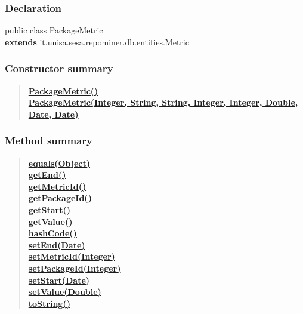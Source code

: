 {{{\subsubsection{Declaration}{
\small public class PackageMetric
\\ {\bf  extends} it.unisa.sesa.repominer.db.entities.Metric
}
\subsubsection{Constructor summary}{
\begin{verse}
\hyperlink{it.unisa.sesa.repominer.db.entities.PackageMetric()}{{\bf PackageMetric()}} \\
\hyperlink{it.unisa.sesa.repominer.db.entities.PackageMetric(java.lang.Integer, java.lang.String, java.lang.String, java.lang.Integer, java.lang.Integer, java.lang.Double, java.util.Date, java.util.Date)}{{\bf PackageMetric(Integer, String, String, Integer, Integer, Double, Date, Date)}} \\
\end{verse}
}
\subsubsection{Method summary}{
\begin{verse}
\hyperlink{it.unisa.sesa.repominer.db.entities.PackageMetric.equals(java.lang.Object)}{{\bf equals(Object)}} \\
\hyperlink{it.unisa.sesa.repominer.db.entities.PackageMetric.getEnd()}{{\bf getEnd()}} \\
\hyperlink{it.unisa.sesa.repominer.db.entities.PackageMetric.getMetricId()}{{\bf getMetricId()}} \\
\hyperlink{it.unisa.sesa.repominer.db.entities.PackageMetric.getPackageId()}{{\bf getPackageId()}} \\
\hyperlink{it.unisa.sesa.repominer.db.entities.PackageMetric.getStart()}{{\bf getStart()}} \\
\hyperlink{it.unisa.sesa.repominer.db.entities.PackageMetric.getValue()}{{\bf getValue()}} \\
\hyperlink{it.unisa.sesa.repominer.db.entities.PackageMetric.hashCode()}{{\bf hashCode()}} \\
\hyperlink{it.unisa.sesa.repominer.db.entities.PackageMetric.setEnd(java.util.Date)}{{\bf setEnd(Date)}} \\
\hyperlink{it.unisa.sesa.repominer.db.entities.PackageMetric.setMetricId(java.lang.Integer)}{{\bf setMetricId(Integer)}} \\
\hyperlink{it.unisa.sesa.repominer.db.entities.PackageMetric.setPackageId(java.lang.Integer)}{{\bf setPackageId(Integer)}} \\
\hyperlink{it.unisa.sesa.repominer.db.entities.PackageMetric.setStart(java.util.Date)}{{\bf setStart(Date)}} \\
\hyperlink{it.unisa.sesa.repominer.db.entities.PackageMetric.setValue(java.lang.Double)}{{\bf setValue(Double)}} \\
\hyperlink{it.unisa.sesa.repominer.db.entities.PackageMetric.toString()}{{\bf toString()}} \\
\end{verse}
}
}}}
